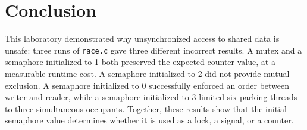 \documentclass[12pt,a4paper]{article}
\begin{document}
\section{Conclusion}
This laboratory demonstrated why unsynchronized access to shared data is unsafe: three runs of \texttt{race.c} gave three different incorrect results. A mutex and a semaphore initialized to 1 both preserved the expected counter value, at a measurable runtime cost. A semaphore initialized to 2 did not provide mutual exclusion. A semaphore initialized to 0 successfully enforced an order between writer and reader, while a semaphore initialized to 3 limited six parking threads to three simultaneous occupants. Together, these results show that the initial semaphore value determines whether it is used as a lock, a signal, or a counter.
\end{document}
